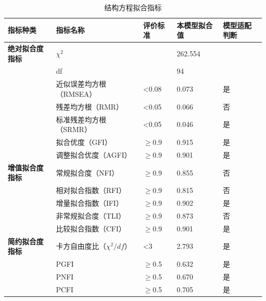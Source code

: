 \documentclass[12pt,UTF8]{ctexart}
\begin{document}
\begin{spacing}{1.25}
\begin{table}[H]
\centering
\caption{结构方程拟合指标}
\label{tab:sem}
\begin{tabular}{@{}lllll@{}}
\toprule
\textbf{指标种类}    & \textbf{指标名称}         & \textbf{评价标准}   & \textbf{本模型拟合值} & \textbf{模型适配判断} \\ \midrule
\textbf{绝对拟合度指标} & $\chi^{2}$            &                 & 262.554         &                 \\
\textbf{}        & df                    &                 & 94              &                 \\
\textbf{}        & 近似误差均方根（RMSEA）        & \textless{}0.08 & 0.073           & 是               \\
\textbf{}        & 残差均方根（RMR）            & \textless{}0.05 & 0.066           & 否               \\
\textbf{}        & 标准残差均方根（SRMR）            & \textless{}0.05 & 0.046           & 是               \\
\textbf{}        & 拟合优度（GFI）             & $\geq$0.9       & 0.915           & 是               \\
                 & 调整拟合优度（AGFI）          & $\geq$0.9       & 0.901           & 是               \\ \midrule
\textbf{增值拟合度指标} & 常规拟合度（NFI）            & $\geq$0.9       & 0.855           & 否               \\
\textbf{}        & 相对拟合指数（RFI）           & $\geq$0.9       & 0.815           & 否               \\
\textbf{}        & 增量拟合指数（IFI）           & $\geq$0.9       & 0.902           & 是               \\
\textbf{}        & 非常规拟合度（TLI）           & $\geq$0.9       & 0.873           & 否               \\
\textbf{}        & 比较拟合指数（CFI）           & $\geq$0.9       & 0.901           & 是               \\ \midrule
\textbf{简约拟合度指标} & 卡方自由度比（$\chi^{2}/df$） & \textless{}3    & 2.793           & 是               \\
\textbf{}        & PGFI                  & $\geq$0.5       & 0.632           & 是               \\
\textbf{}        & PNFI                  & $\geq$0.5       & 0.670           & 是               \\
\textbf{}        & PCFI                  & $\geq$0.5       & 0.705           & 是               \\

\end{tabular}
\end{table}
\end{spacing}
\end{document}
